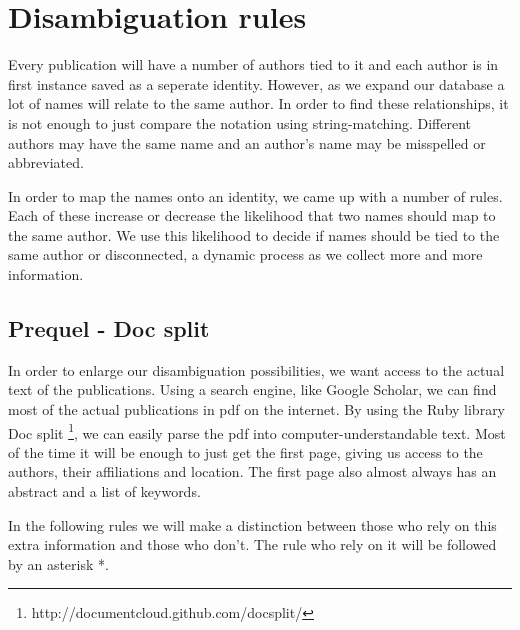 \section{Disambiguation rules}
\label{disamb_rules}

Every publication will have a number of authors tied to it and each author is in first instance saved as a seperate identity. However, as we expand our database a lot of names will relate to the same author. In order to find these relationships, it is not enough to just compare the notation using string-matching. Different authors may have the same name and an author's name may be misspelled or abbreviated.

In order to map the names onto an identity, we came up with a number of rules. Each of these increase or decrease the likelihood that two names should map to the same author. We use this likelihood to decide if names should be tied to the same author or disconnected, a dynamic process as we collect more and more information.


\subsection{Prequel - Doc split}

In order to enlarge our disambiguation possibilities, we want access to the actual text of the publications. Using a search engine, like Google Scholar, we can find most of the actual publications in pdf on the internet. By using the Ruby library Doc split \footnote{http://documentcloud.github.com/docsplit/}, we can easily parse the pdf into computer-understandable text. Most of the time it will be enough to just get the first page, giving us access to the authors, their affiliations and location. The first page also almost always has an abstract and a list of keywords.

In the following rules we will make a distinction between those who rely on this extra information and those who don't. The rule who rely on it will be followed by an asterisk *.

